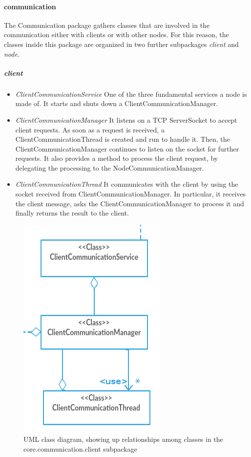 \documentclass{article}
\begin{document}
\paragraph{communication} The Communication package gathers classes that are involved in the communication either with clients or with other nodes. For this reason, the classes inside this package are organized in two further subpackages \textit{client} and \textit{node}. 
\subparagraph{client} 
\begin{itemize}
\item \textit{ClientCommunicationService} One of the three fundamental services a node is made of. It starts and shuts down a ClientCommunicationManager.
\item \textit{ClientCommunicationManager} It listens on a TCP ServerSocket to accept client requests. As soon as a request is received, a ClientCommunicationThread is created and run to handle it. Then, the ClientCommunicationManager continues to listen on the socket for further requests. It also provides a method to process the client request, by delegating the processing to the NodeCommunicationManager.
\item \textit{ClientCommunicationThread} It communicates with the client by using the socket received from ClientCommunicationManager. In particular, it receives the client message, asks the ClientCommunicationManager to process it and finally returns the result to the client.
\end{itemize}
\begin{figure}
\centering
\includegraphics[scale=0.40]{classes_client_subpackage}
\caption{UML class diagram, showing up relationships among classes in the core.communication.client subpackage}
\label{fig:class_diag_core.communication.client	}
\end{figure}
\end{document}
